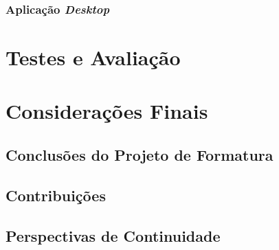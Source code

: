 \documentclass[]{politex}
\begin{document}
\subsection{Aplicação \textit{Desktop}}

\chapter{Testes e Avaliação}
\chapter{Considerações Finais}
	\section{Conclusões do Projeto de Formatura}
	\section{Contribuições}
	\section{Perspectivas de Continuidade}
	





%








\end{document}
